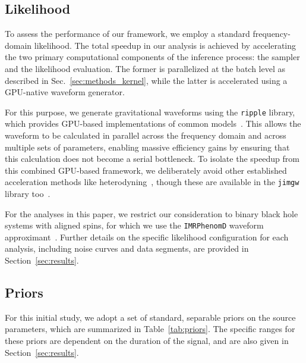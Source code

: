 \documentclass[fleqn,usenatbib]{mnras}
\begin{document}
\subsection{Likelihood}

To assess the performance of our framework, we employ a standard
frequency-domain likelihood. The total
speedup in our analysis is achieved by accelerating the two primary
computational components of the inference process: the sampler and the
likelihood evaluation. The former is parallelized at the batch level as
described in Sec.~\ref{sec:methods_kernel}, while the latter is
accelerated using a GPU-native waveform generator.

For this purpose, we generate gravitational waveforms using the
\texttt{ripple} library, which provides GPU-based implementations of
common models~\citep{ripple, wong2023fastgravitationalwaveparameter, Wouters_BNS}. 
This allows the waveform to be calculated
in parallel across the frequency domain and 
across multiple sets of parameters, enabling massive efficiency gains by 
ensuring that this calculation does not become a serial bottleneck.
To isolate the speedup from this combined GPU-based framework,
we deliberately avoid other established acceleration methods like 
heterodyning~\citep{TL_relativebinning, relativebinning2, relativebinning3, relativebinning4}, 
though these are available in the \texttt{jimgw} library too~\citep{wong2023fastgravitationalwaveparameter}.

For the analyses in this paper, we restrict our consideration to binary
black hole systems with aligned spins, for which we use the
\texttt{IMRPhenomD} waveform approximant~\citep{Khan:2015jqa}.
Further details on the specific likelihood configuration for each
analysis, including noise curves and data segments, are provided in Section~\ref{sec:results}.


\subsection{Priors}

For this initial study, we adopt a set of standard, separable priors on
the source parameters, which are summarized in Table~\ref{tab:priors}.
The specific ranges for these priors are dependent on the duration of the signal, and are
also given in Section~\ref{sec:results}.
\end{document}
